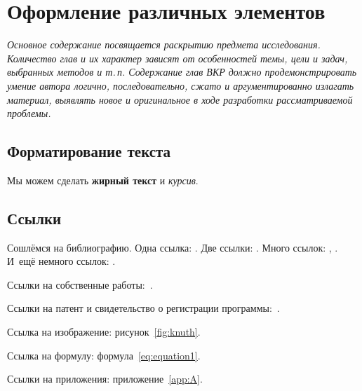 \begingroup
  \let\clearpage\relax                        %
  \par\vspace{3ex}                            %
  \chapter{Оформление различных элементов}\label{ch:ch1}
\endgroup

\textit{Основное содержание посвящается раскрытию предмета исследования.
Количество глав и их характер зависят от особенностей темы, цели и задач, выбранных методов и т.\,п.
Содержание глав ВКР должно продемонстрировать умение автора логично, последовательно, сжато и аргументированно излагать материал, выявлять новое и оригинальное в ходе разработки рассматриваемой проблемы.}

\vspace{2ex}

\section{Форматирование текста}\label{sec:ch1/sec1}

Мы можем сделать \textbf{жирный текст} и \textit{курсив}.

\section{Ссылки}\label{sec:ch1/sec2}

Сошлёмся на библиографию.
Одна ссылка: \cite[с.~54]{Sokolov}.
Две ссылки: \cite{Sokolov, Gaidaenko}.
Много ссылок:
\cite{Gost.7.0.53, Razumovski, Lagkueva, Pokrovski, Methodology, Berestova, Kriger}, \cite{Sirotko, Lukina, Encyclopedia, Nasirova}.
И~ещё немного ссылок:
\cite{Article,Book,Booklet,Conference,Inbook,Incollection,Manual,Mastersthesis,Misc,Phdthesis,Proceedings,Techreport,Unpublished}.


Ссылки на собственные работы:~\cite{bib2, bib3}.

Ссылки на патент и свидетельство о регистрации программы:~\cite{patbib1, progbib1}.

Ссылка на изображение: рисунок~\cref{fig:knuth}.

Ссылка на формулу: формула~\cref{eq:equation1}.

Ссылки на приложения: приложение~\cref{app:A}.

